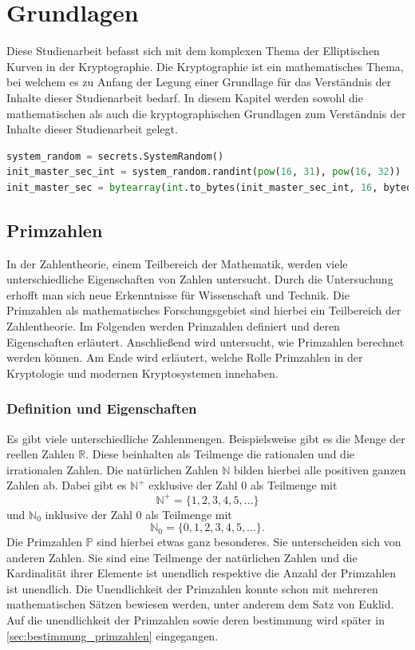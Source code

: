 \chapter{Grundlagen}
Diese Studienarbeit befasst sich mit dem komplexen Thema der Elliptischen Kurven in der Kryptographie. Die Kryptographie ist ein mathematisches Thema, bei welchem es zu Anfang der Legung einer Grundlage für das Verständnis der Inhalte dieser Studienarbeit bedarf. In diesem Kapitel werden sowohl die mathematischen als auch die kryptographischen Grundlagen zum Verständnis der Inhalte dieser Studienarbeit gelegt.

\begin{lstlisting}[caption={Erzeugung des initialen Master Secrets}, captionpos=b, language=Python]
system_random = secrets.SystemRandom()
init_master_sec_int = system_random.randint(pow(16, 31), pow(16, 32))
init_master_sec = bytearray(int.to_bytes(init_master_sec_int, 16, byteorder='big', signed=False))
\end{lstlisting}

\section{Primzahlen}
In der Zahlentheorie, einem Teilbereich der Mathematik, werden viele unterschiedliche Eigenschaften von Zahlen untersucht. Durch die Untersuchung erhofft man sich neue Erkenntnisse für Wissenschaft und Technik. Die Primzahlen als mathematisches Forschungsgebiet sind hierbei ein Teilbereich der Zahlentheorie. Im Folgenden werden Primzahlen definiert und deren Eigenschaften erläutert. Anschließend wird untersucht, wie Primzahlen berechnet werden können. Am Ende wird erläutert, welche Rolle Primzahlen in der Kryptologie und modernen Kryptosystemen innehaben.

\subsection{Definition und Eigenschaften}
Es gibt viele unterschiedliche Zahlenmengen. Beispielsweise gibt es die Menge der reellen Zahlen $\mathbb{R}$. Diese beinhalten als Teilmenge die rationalen und die irrationalen Zahlen. Die natürlichen Zahlen $\mathbb{N}$ bilden hierbei alle positiven ganzen Zahlen ab. Dabei gibt es $\mathbb{N^{+}}$ exklusive der Zahl 0 als Teilmenge mit \[\mathbb{N^{+}} = \{1, 2, 3, 4, 5, ...\}\] und $\mathbb{N}_0$ inklusive der Zahl 0 als Teilmenge mit \[\mathbb{N}_0 = \{0, 1, 2, 3, 4, 5, ...\}.\] Die Primzahlen $\mathbb{P}$ sind hierbei etwas ganz besonderes. Sie unterscheiden sich von anderen Zahlen. Sie sind eine Teilmenge der natürlichen Zahlen und die Kardinalität ihrer Elemente ist unendlich respektive die Anzahl der Primzahlen ist unendlich. Die Unendlichkeit der Primzahlen konnte schon mit mehreren mathematischen Sätzen bewiesen werden, unter anderem dem Satz von Euklid. Auf die unendlichkeit der Primzahlen sowie deren bestimmung wird später in \ref{sec:bestimmung_primzahlen} eingegangen.\\

